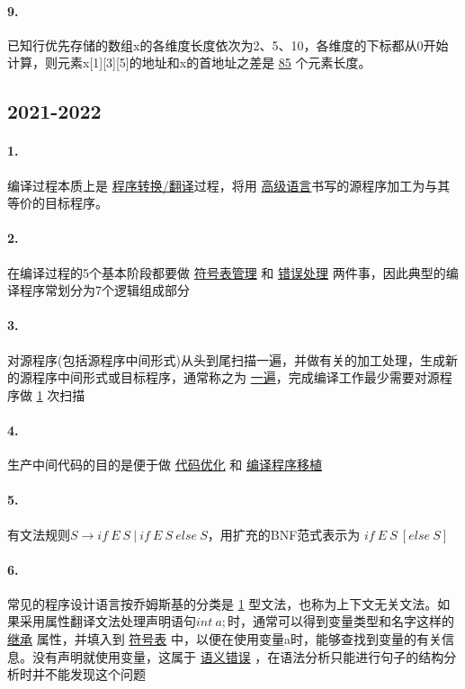 \documentclass[UTF8]{ctexart} %
\begin{document}
\paragraph{9.} 已知行优先存储的数组x的各维度长度依次为2、5、10，各维度的下标都从0开始计算，则元素x[1][3][5]的地址和x的首地址之差是 \underline{85} 个元素长度。

\subsection{2021-2022}

\paragraph{1.} 编译过程本质上是 \underline{程序转换/翻译}过程，将用 \underline{高级语言}书写的源程序加工为与其等价的目标程序。

\paragraph{2.} 在编译过程的5个基本阶段都要做 \underline{符号表管理} 和 \underline{错误处理} 两件事，因此典型的编译程序常划分为7个逻辑组成部分

\paragraph{3.} 对源程序(包括源程序中间形式)从头到尾扫描一遍，并做有关的加工处理，生成新的源程序中间形式或目标程序，通常称之为 \underline{一遍}，完成编译工作最少需要对源程序做 \underline{1} 次扫描

\paragraph{4.} 生产中间代码的目的是便于做 \underline{代码优化} 和 \underline{编译程序移植}

\paragraph{5.} 有文法规则$S\rightarrow if\ E\ S\ |\ if\ E\ S\ else\ S$，用扩充的BNF范式表示为 \underline{$if\ E\ S\ [else\ S]$}

\paragraph{6.} 常见的程序设计语言按乔姆斯基的分类是 \underline{1} 型文法，也称为上下文无关文法。如果采用属性翻译文法处理声明语句$int\ a;$时，通常可以得到变量类型和名字这样的 \underline{继承} 属性，并填入到 \underline{符号表} 中，以便在使用变量a时，能够查找到变量的有关信息。没有声明就使用变量，这属于 \underline{语义错误} ，在语法分析只能进行句子的结构分析时并不能发现这个问题
\end{document}
